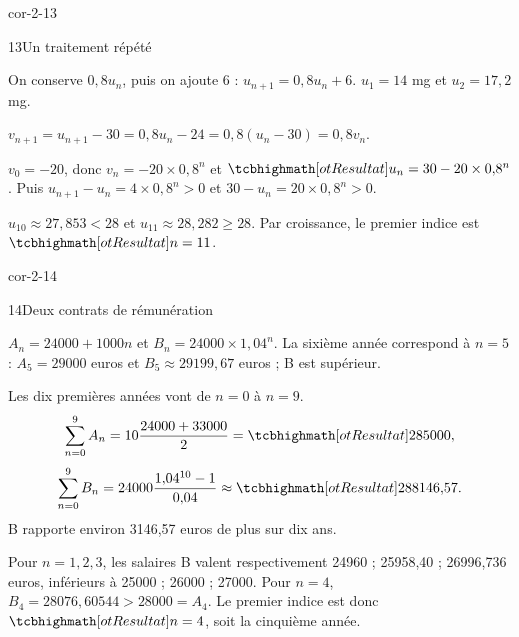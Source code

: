 \begin{blocLivre}{cor-2-13}
\begin{corrige}{13}{Un traitement répété}
\begin{questions}
\item On conserve $0{,}8u_n$, puis on ajoute 6 : $u_{n+1}=0{,}8u_n+6$.
$u_1=14$ mg et $u_2=17{,}2$ mg.
\item $v_{n+1}=u_{n+1}-30=0{,}8u_n-24=0{,}8(u_n-30)=0{,}8v_n$.
\item $v_0=-20$, donc $v_n=-20\times0{,}8^n$ et
$\res{u_n=30-20\times0{,}8^n}$.
Puis $u_{n+1}-u_n=4\times0{,}8^n>0$ et $30-u_n=20\times0{,}8^n>0$.
\item $u_{10}\approx27{,}853<28$ et $u_{11}\approx28{,}282\geq28$.
Par croissance, le premier indice est $\res{n=11}$.
\end{questions}
\label{figlivre-r02-13-cycle-cor}

\end{corrige}
\end{blocLivre}
\begin{blocLivre}{cor-2-14}
\begin{corrige}{14}{Deux contrats de rémunération}
\begin{questions}
\item $A_n=24000+1000n$ et $B_n=24000\times1{,}04^n$.
La sixième année correspond à $n=5$ : $A_5=29000$ euros et
$B_5\approx29199{,}67$ euros ; B est supérieur.
\item Les dix premières années vont de $n=0$ à $n=9$.
\[\sum_{n=0}^9 A_n=10\frac{24000+33000}2=\res{285000},\]
\[\sum_{n=0}^9 B_n=24000\frac{1{,}04^{10}-1}{0{,}04}\approx\res{288146{,}57}.\]
B rapporte environ 3146,57 euros de plus sur dix ans.
\item Pour $n=1,2,3$, les salaires B valent respectivement
24960 ; 25958,40 ; 26996,736 euros, inférieurs à 25000 ; 26000 ; 27000.
Pour $n=4$, $B_4=28076{,}60544>28000=A_4$.
Le premier indice est donc $\res{n=4}$, soit la cinquième année.
\end{questions}
\label{figlivre-r02-14-salaires-cor}

\end{corrige}
\end{blocLivre}
